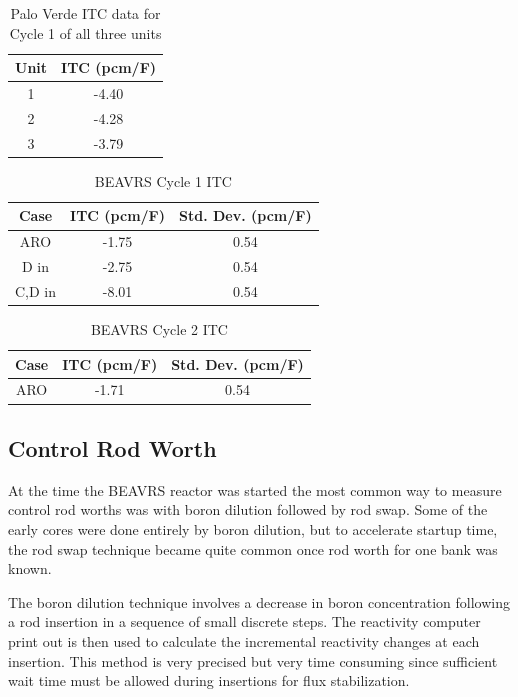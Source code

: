 \documentclass{article}
\begin{document}
\begin{table}[ht]
\centering
\caption{Palo Verde ITC data for Cycle 1 of all three units}
\begin{tabular}{ |c|c| } 
 \hline
 Unit & ITC (pcm/F) \\  
 \hline
 1 & -4.40 \\ 
 2 & -4.28 \\
 3 & -3.79 \\
 \hline
 \end{tabular}
\label{tab:palov_itc_cyc1}
\end{table}


\begin{table}[ht]
\centering
\caption{BEAVRS Cycle 1 ITC}
\begin{tabular}{ |c|c|c| } 
 \hline
 Case & ITC (pcm/F) & Std. Dev. (pcm/F) \\  
 \hline
 ARO & -1.75 & 0.54 \\ 
 D in & -2.75 & 0.54  \\
 C,D in & -8.01 & 0.54  \\
 \hline
 \end{tabular}
\label{tab:beavrs_itc_cyc1}
\end{table}

\begin{table}[ht]
\centering
\caption{BEAVRS Cycle 2 ITC}
\begin{tabular}{ |c|c|c| } 
 \hline
 Case & ITC (pcm/F) & Std. Dev. (pcm/F) \\  
 \hline
 ARO & -1.71 & 0.54 \\ 
 \hline
 \end{tabular}
\label{tab:beavrs_itc_cyc2}
\end{table}


\subsection{Control Rod Worth}

At the time the BEAVRS reactor was started the most common way to measure control rod worths was with boron dilution followed by rod swap.  Some of the early cores were done entirely by boron dilution, but to accelerate startup time, the rod swap technique became quite common once rod worth for one bank was known.  

The boron dilution technique involves a decrease in boron concentration following a rod insertion in a sequence of small discrete steps.  The reactivity computer print out is then used to calculate the incremental reactivity changes at each insertion.  This method is very precised but very time consuming since sufficient wait time must be allowed during insertions for flux stabilization.
\end{document}

